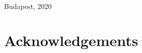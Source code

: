 \documentclass[runningheads,a4paper]{report}
\theoremstyle{definition}
\begin{document}
\begin{titlepage}
  \vfill

  \begin{center}
    \large Budapest, 2020
  \end{center}
\end{titlepage}



\begin{abstract}


\end{abstract}

\tableofcontents


% 


\label{chp:related}









\chapter{Acknowledgements}
\end{document}
